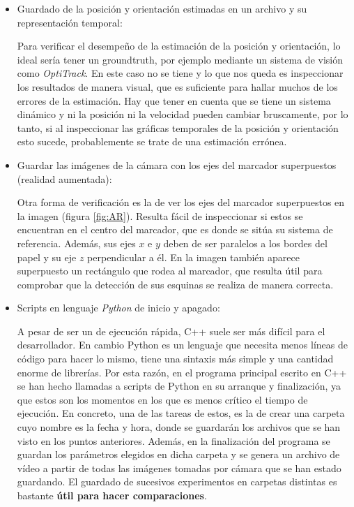 \begin{itemize}
\item Guardado de la posición y orientación estimadas en un archivo y su representación temporal: 

	Para verificar el desempeño de la estimación de la posición y orientación, lo ideal sería tener un groundtruth, por ejemplo mediante un sistema de visión como \textit{OptiTrack}. En este caso no se tiene y lo que nos queda es inspeccionar los resultados de manera visual, que es suficiente para hallar muchos de los errores de la estimación. Hay que tener en cuenta que se tiene un sistema dinámico y ni la posición ni la velocidad pueden cambiar bruscamente, por lo tanto, si al inspeccionar las gráficas temporales de la posición y orientación esto sucede, probablemente se trate de una estimación errónea. 

\item Guardar las imágenes de la cámara con los ejes del marcador superpuestos (realidad aumentada):

	Otra forma de verificación es la de ver los ejes del marcador superpuestos en la imagen (figura \ref{fig:AR}). Resulta fácil de inspeccionar si estos se encuentran en el centro del marcador, que es donde se sitúa su sistema de referencia. Además, sus ejes $x$ e $y$ deben de ser paralelos a los bordes del papel y su eje $z$ perpendicular a él. En la imagen también aparece superpuesto un rectángulo que rodea al marcador, que resulta útil para comprobar que la detección de sus esquinas se realiza de manera correcta.  
	\figAR

\item Scripts en lenguaje \textit{Python} de inicio y apagado:

	A pesar de ser un de ejecución rápida, C++ suele ser más difícil para el desarrollador. En cambio Python es un lenguaje que necesita menos líneas de código para hacer lo mismo, tiene una sintaxis más simple y una cantidad enorme de librerías. 
	Por esta razón, en el programa principal escrito en C++ se han hecho llamadas a scripts de Python en su arranque y finalización, ya que estos son los momentos en los que es menos crítico el tiempo de ejecución. 
	En concreto, una de las tareas de estos, es la de crear una carpeta cuyo nombre es la fecha y hora, donde se guardarán los archivos que se han visto en los puntos anteriores. Además, en la finalización del programa se guardan los parámetros elegidos en dicha carpeta y se genera un archivo de vídeo a partir de todas las imágenes tomadas por cámara que se han estado guardando.
	El guardado de sucesivos experimentos en carpetas distintas es bastante \textbf{útil para hacer comparaciones}.
\end{itemize}

